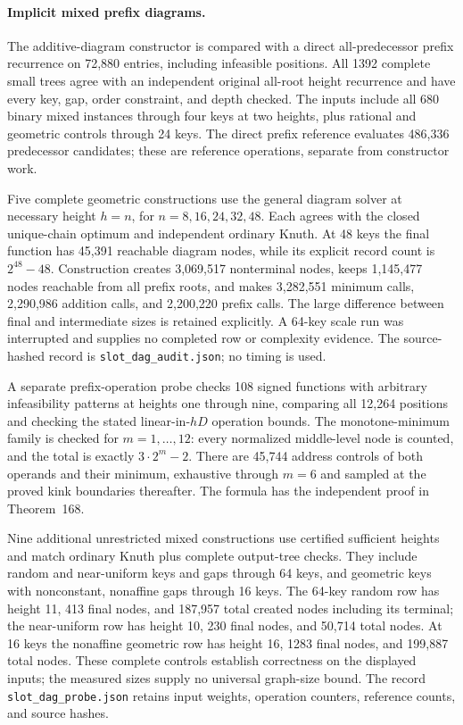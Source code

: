\documentclass[11pt]{article}
\begin{document}
\paragraph{Implicit mixed prefix diagrams.}
The additive-diagram constructor is compared with a direct all-predecessor
prefix recurrence on 72,880 entries, including infeasible positions. All
1392 complete small trees agree with an independent original all-root
height recurrence and have every key, gap, order constraint, and depth
checked. The inputs include all 680 binary mixed instances through four
keys at two heights, plus rational and geometric controls through 24 keys.
The direct prefix reference evaluates 486,336 predecessor candidates;
these are reference operations, separate from constructor work.

Five complete geometric constructions use the general diagram solver at
necessary height $h=n$, for $n=8,16,24,32,48$. Each agrees with the closed
unique-chain optimum and independent ordinary Knuth. At 48 keys the final
function has 45,391 reachable diagram nodes, while its explicit record
count is $2^{48}-48$. Construction creates 3,069,517 nonterminal nodes,
keeps 1,145,477 nodes reachable from all prefix roots, and makes 3,282,551
minimum calls, 2,290,986 addition calls, and 2,200,220 prefix calls.
The large difference between final and intermediate sizes is retained
explicitly. A 64-key scale run was interrupted and supplies no completed
row or complexity evidence. The source-hashed record is
\texttt{slot\_dag\_audit.json}; no timing is used.

A separate prefix-operation probe checks 108 signed functions with arbitrary
infeasibility patterns at heights one through nine, comparing all 12,264
positions and checking the stated linear-in-$hD$ operation bounds.
The monotone-minimum family is checked for $m=1,\ldots,12$: every
normalized middle-level node is counted, and the total is exactly
$3\cdot2^m-2$. There are 45,744 address controls of both operands and
their minimum, exhaustive through $m=6$ and sampled at the proved kink
boundaries thereafter. The formula has the independent proof in
Theorem~168.

Nine additional unrestricted mixed constructions use certified sufficient
heights and match ordinary Knuth plus complete output-tree checks. They
include random and near-uniform keys and gaps through 64 keys, and
geometric keys with nonconstant, nonaffine gaps through 16 keys. The
64-key random row has height 11, 413 final nodes, and 187,957 total
created nodes including its terminal; the near-uniform row has height 10,
230 final nodes, and 50,714 total nodes. At 16 keys the nonaffine
geometric row has height 16, 1283 final nodes, and 199,887 total nodes.
These complete controls establish correctness on the displayed inputs;
the measured sizes supply no universal graph-size bound. The record
\texttt{slot\_dag\_probe.json} retains input weights, operation counters,
reference counts, and source hashes.
\end{document}

